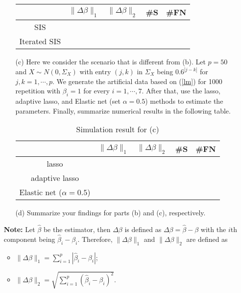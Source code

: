 \documentclass[11pt]{article}
\begin{document}
\begin{enumerate}
\begin{itemize}
\begin{table}[!ht]
   \scriptsize

 \centering
  \renewcommand{\arraystretch}{0.9}
 \begin{tabular}{c c c c c}
 \\
 \hline
& $\|\Delta\beta\|_1$ & $\|\Delta\beta\|_2$ & \#S & \#FN \\
\hline
SIS & \\
Iterated SIS & \\ 
 \hline 
\end{tabular}

\end{table}


\item[(c)] Here we consider the scenario that is different from (b). Let $p=50$ and $X \sim N(0,\Sigma_X)$ with entry $(j,k)$ in $\Sigma_X$ being $0.6^{|j-k|}$ for $j,k=1,\cdots,p$. We generate the artificial data based on (\ref{lm}) for 1000 repetition with  $\beta_i=1$ for every $i=1,\cdots,7$. After that, use the lasso, adaptive lasso, and Elastic net (set $\alpha=0.5$) methods to estimate the parameters. Finally, summarize numerical results in the following table.


\begin{table}[!ht]
       \huge
     \caption{Simulation result for (c)}

   \scriptsize

 \centering
  \renewcommand{\arraystretch}{0.9}
 \begin{tabular}{c c c c c}
 \\
 \hline
& $\|\Delta\beta\|_1$ & $\|\Delta\beta\|_2$ & \#S & \#FN \\
\hline
lasso & \\
adaptive lasso & \\
Elastic net ($\alpha=0.5$) & \\ 
 \hline 
\end{tabular}

\end{table}

\item[(d)] Summarize your findings for parts (b) and (c), respectively.

\end{itemize}

{\bf Note:} Let $\widehat{\beta}$ be the estimator, then $\Delta\beta$ is defined as $\Delta\beta = \widehat{\beta} - \beta$ with the $i$th component being $\widehat{\beta}_i - \beta_i$. Therefore, $\|\Delta\beta\|_1$ and $\|\Delta\beta\|_2$ are defined as
\begin{itemize}
\item $\|\Delta\beta\|_1 = \sum \limits_{i=1}^p \left| \widehat{\beta}_i - \beta_i \right|$;
\item $\|\Delta\beta\|_2 = \sqrt{ \sum \limits_{i=1}^p \left( \widehat{\beta}_i - \beta_i \right)^2 }$.
\end{itemize}



\end{enumerate}
\end{document}
